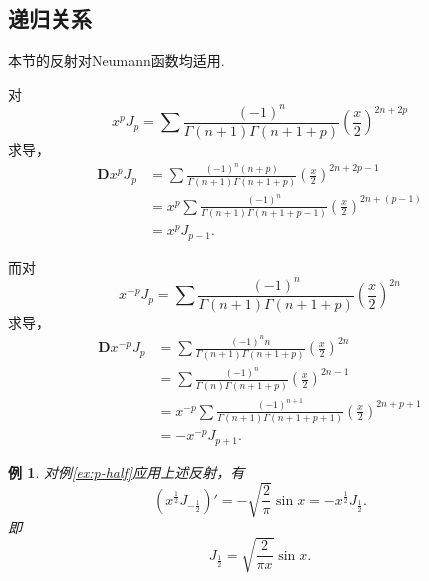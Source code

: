 \documentclass[UTF-8]{ctexart}
\newcommand{\pare}[1]{\left(#1\right)}
\newcommand{\half}{\frac{1}{2}}
\newcommand{\DD}{\mathbf{D}}
\newtheorem{reflection}{反射}
\newcommand{\refl}[1]{\vspace{0.5em}\par\noindent\fbox{%
    \parbox{\textwidth}{%
    \begin{reflection}
        #1
    \end{reflection}
    }%
}\vspace{0.5em}\par}
\newcommand{\eref}[1]{例\ref{ex:#1}}
\newtheorem{ex}{例}
\begin{document}
  \subsection{递归关系}
  本节的反射对Neumann函数均适用.
  \par 
  对
  \[ x^pJ_p = \sum \frac{\pare{-1}^n}{\Gamma\pare{n+1}\Gamma\pare{n+1+p}}\pare{\frac{x}{2}}^{2n+2p} \]
  求导，
  \begin{align*}
    \DD x^p J_p &= \sum \frac{\pare{-1}^n \pare{n+p}}{\Gamma\pare{n+1}\Gamma\pare{n+1+p}}\pare{\frac{x}{2}}^{2n+2p-1} \\
    &= x^p \sum \frac{\pare{-1}^n}{\Gamma\pare{n+1}\Gamma\pare{n+1+p-1}}\pare{\frac{x}{2}}^{2n+\pare{p-1}} \\
    &= x^p J_{p-1}.
  \end{align*}
  \refl{
  \label{refl:jpp0}
    \[ \pare{x^pJ_p}' = x^pJ_{p-1}. \]
  }
  而对
  \[ x^{-p}J_p = \sum \frac{\pare{-1}^n}{\Gamma\pare{n+1}\Gamma\pare{n+1+p}}\pare{\frac{x}{2}}^{2n} \]
  求导，
  \begin{align*}
    \DD x^{-p} J_p &= \sum \frac{\pare{-1}^n n}{\Gamma\pare{n+1}\Gamma\pare{n+1+p}}\pare{\frac{x}{2}}^{2n} \\
    &= \sum \frac{\pare{-1}^n}{\Gamma\pare{n}\Gamma\pare{n+1+p}}\pare{\frac{x}{2}}^{2n-1} \\
    &= x^{-p} \sum \frac{\pare{-1}^{n+1}}{\Gamma\pare{n+1}\Gamma\pare{n+1+p+1}}\pare{\frac{x}{2}}^{2n+p+1} \\
    &= -x^{-p}J_{p+1}.
  \end{align*}
  \refl{
  \label{refl:jpp1}
    \[ \pare{x^{-p}J_p}' = -x^{-p}J_{p+1}. \]
  }
  \begin{ex}
    \label{ex:phalf}
    对\eref{p-half}应用上述反射，有
    \[ \pare{x^{\half}J_{-\half}}' = -\sqrt{\frac{2}{\pi}}\sin x = -x^{\half}J_{\half}. \]
    即
    \[ J_\half = \sqrt{\frac{2}{\pi x}}\sin x. \]
  \end{ex}
\end{document}
